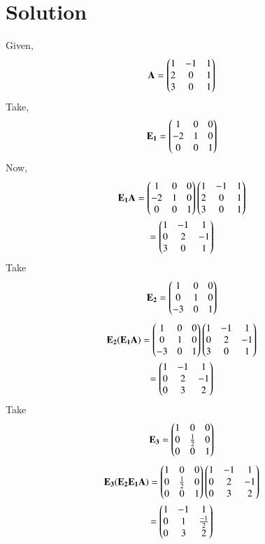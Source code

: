 \documentclass[journal,12pt,twocolumn]{IEEEtran}
\begin{document}
\section{Solution}
Given,
\begin{align}
\mathbf{A}=\begin{pmatrix}1 & -1 & 1 \\ 2 & 0 & 1 \\ 3 & 0 & 1\end{pmatrix}	
\end{align}
Take,
\begin{align}
\mathbf{E_1}=\begin{pmatrix}1 & 0 & 0 \\ -2 & 1 & 0 \\ 0 & 0 & 1\end{pmatrix}
\end{align} 
Now,
\begin{multline}
 \mathbf{E_1A} = \begin{pmatrix}1 & 0 & 0 \\-2 & 1 &0 \\ 0 & 0 & 1\end{pmatrix}\begin{pmatrix}1 & -1 & 1 \\ 2 & 0 & 1 \\ 3 & 0 & 1\end{pmatrix} \\=\begin{pmatrix}1 & -1 & 1 \\ 0 & 2 & -1 \\ 3 & 0 & 1\end{pmatrix} \\ 
\end{multline}
Take
\begin{align}
\mathbf{E_2} = \begin{pmatrix}1 & 0 & 0 \\0 & 1 &0 \\ -3 & 0&1\end{pmatrix}
\end{align}
\begin{multline}
 \mathbf{E_2(E_1A)} = \begin{pmatrix}1 & 0 & 0 \\0 & 1 &0 \\ -3 & 0&1\end{pmatrix} \begin{pmatrix}1 & -1 & 1 \\ 0 & 2 & -1 \\ 3 & 0 & 1\end{pmatrix}
\\= \begin{pmatrix}1 & -1 & 1 \\ 0 & 2 & -1 \\ 0 & 3 & 2\end{pmatrix}
\end{multline}
Take 
\begin{align}
\mathbf{E_3} = \begin{pmatrix}1 & 0 & 0 \\0 & \frac{1}{2} &0 \\ 0 & 0&1\end{pmatrix}
\end{align}
\begin{multline}
	\mathbf{E_3(E_2E_1A)} = \begin{pmatrix}1 & 0 & 0 \\0 & \frac{1}{2} & 0 \\ 0 & 0 & 1\end{pmatrix}\begin{pmatrix}1 & -1 & 1 \\ 0 & 2 & -1 \\ 0 & 3 & 2\end{pmatrix}\\
	= \begin{pmatrix}1 & -1 & 1 \\ 0 & 1 & \frac{-1}{2} \\ 0 & 3 & 2\end{pmatrix}
\end{multline}
\end{document}
